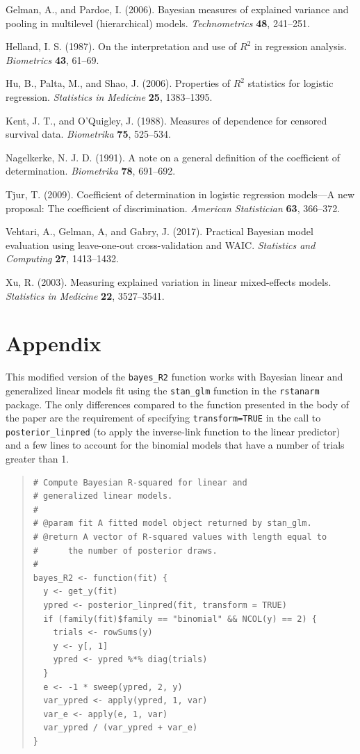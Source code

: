 \documentclass[11pt]{article}
\begin{document}
\bibitem Gelman, A., and Pardoe, I. (2006).  Bayesian measures of explained variance and pooling in multilevel (hierarchical) models. {\em Technometrics} {\bf 48}, 241--251.

\bibitem Helland, I. S. (1987).  On the interpretation and use of $R^2$ in regression analysis.  {\em Biometrics} {\bf 43}, 61--69.

\bibitem Hu, B., Palta, M., and Shao, J. (2006).  Properties of $R^2$ statistics for logistic regression.  {\em Statistics in Medicine} {\bf 25}, 1383--1395.

\bibitem Kent, J. T., and O'Quigley, J. (1988). Measures of dependence for censored survival data. {\em Biometrika} {\bf 75}, 525--534.

\bibitem Nagelkerke, N. J. D. (1991).  A note on a general definition of the coefficient of determination. {\em Biometrika} {\bf 78}, 691--692.

\bibitem Tjur, T. (2009).  Coefficient of determination in logistic regression models---A new proposal:  The coefficient of discrimination.  {\em American Statistician} {\bf 63}, 366--372.

\bibitem Vehtari, A., Gelman, A, and Gabry, J. (2017).  Practical Bayesian model evaluation using leave-one-out cross-validation and WAIC. {\em Statistics and Computing} {\bf 27}, 1413--1432.

\bibitem Xu, R. (2003).  Measuring explained variation in linear mixed-effects models.  {\em Statistics in Medicine} {\bf 22}, 3527--3541.

\pagebreak

\section*{Appendix}

This modified version of the \verb#bayes_R2# function works with
Bayesian linear and generalized linear models fit using the 
\verb#stan_glm# function in the {\tt rstanarm} package. The only 
differences compared to the function presented in the body of the paper are 
the requirement of specifying \verb#transform=TRUE# in the call to 
\verb#posterior_linpred# (to apply the inverse-link function to the linear 
predictor) and a few lines to account for the binomial models that
have a number of trials greater than 1.
%
\vspace{-\baselineskip}
\begin{quotation}
\noindent
\begin{small}
\begin{verbatim}
# Compute Bayesian R-squared for linear and
# generalized linear models.
#
# @param fit A fitted model object returned by stan_glm.
# @return A vector of R-squared values with length equal to
#      the number of posterior draws.
#
bayes_R2 <- function(fit) {
  y <- get_y(fit)
  ypred <- posterior_linpred(fit, transform = TRUE)
  if (family(fit)$family == "binomial" && NCOL(y) == 2) {
    trials <- rowSums(y)
    y <- y[, 1]
    ypred <- ypred %*% diag(trials)
  }
  e <- -1 * sweep(ypred, 2, y)
  var_ypred <- apply(ypred, 1, var)
  var_e <- apply(e, 1, var)
  var_ypred / (var_ypred + var_e)
}
\end{verbatim}
\end{small}
\end{quotation}
\end{document}
